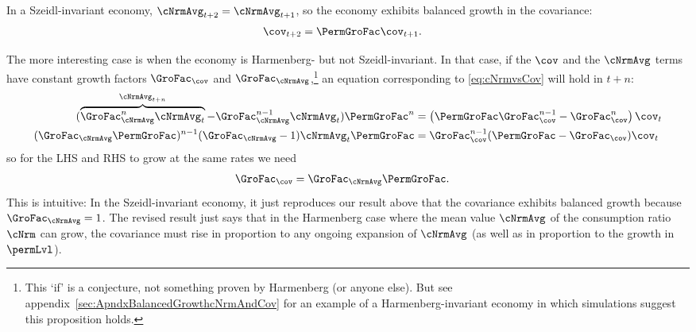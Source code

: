\documentclass[\econtexRoot/BufferStockTheory]{subfiles}
\begin{document}
In a Szeidl-invariant economy, $\cNrmAvg_{t+2} = \cNrmAvg_{t+1}$, so the economy exhibits balanced growth in the covariance:
\begin{equation}\begin{gathered}\begin{aligned}
  \cov_{t+2} & = \PermGroFac \cov_{t+1}.
\end{aligned}\end{gathered}\end{equation}

The more interesting case is when the economy is Harmenberg- but not Szeidl-invariant.
In that case, if the $\cov$ and the $\cNrmAvg$ terms have constant growth factors $\GroFac_{\cov}$ and $\GroFac_{\cNrmAvg}$,\footnote{This `if' is a conjecture, not something proven by Harmenberg (or anyone else).
But see appendix~\ref{sec:ApndxBalancedGrowthcNrmAndCov} for an example of a Harmenberg-invariant economy in which simulations suggest this proposition holds.} an equation corresponding to \eqref{eq:cNrmvsCov} will hold in $t+n$:
\begin{equation} \label{eq:aNrmGrovsCovGronm1}
  \begin{aligned}
    (\overbrace{\GroFac_{\cNrmAvg}^{n}\cNrmAvg_{t}}^{\cNrmAvg_{t+n}}-\GroFac^{n-1}_{\cNrmAvg}\cNrmAvg_{t})\PermGroFac^{n} & = \left(\PermGroFac\GroFac_{\cov}^{n-1} -\GroFac_{\cov}^{n}\right)\cov_{t}
    \\ (\GroFac_{\cNrmAvg}\PermGroFac)^{n-1} (\GroFac_{\cNrmAvg}-1)\cNrmAvg_{t}\PermGroFac & = \GroFac_{\cov}^{n-1}(\PermGroFac - \GroFac_{\cov}) \cov_{t}
  \end{aligned}
\end{equation}
so for the LHS and RHS to grow at the same rates we need
\begin{equation}\begin{gathered}\begin{aligned}
  \GroFac_{\cov}  & = \GroFac_{\cNrmAvg}\PermGroFac \label{eq:aNrmGrovscovGro}.
\end{aligned}\end{gathered}\end{equation}
This is intuitive:  In the Szeidl-invariant economy, it just reproduces our result above that the covariance exhibits balanced growth because $\GroFac_{\cNrmAvg}=1$.
The revised result just says that in the Harmenberg case where the mean value $\cNrmAvg$ of the consumption ratio $\cNrm$ can grow, the covariance must rise in proportion to any ongoing expansion of $\cNrmAvg$ (as well as in proportion to the growth in $\permLvl$).
\end{document}
